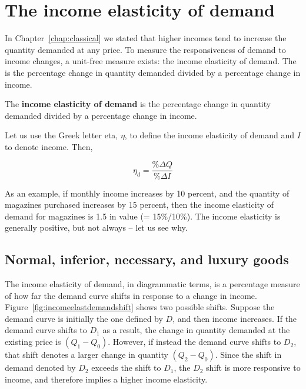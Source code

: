 \section{The income elasticity of demand}\label{sec:ch4sec5}

In Chapter~\ref{chap:classical} we stated that higher incomes tend to increase the quantity demanded at any price. To measure the responsiveness of demand to income changes, a unit-free measure exists: the income elasticity of demand. The  is the percentage change in quantity demanded divided by a percentage change in income.

\begin{DefBox}
The \textbf{income elasticity of demand} is the percentage change in quantity demanded divided by a percentage change in income.
\end{DefBox}

Let us use the Greek letter eta, $\eta$, to define the income elasticity of demand and $I$ to denote income. Then,

\begin{equation*}
\eta_d=\frac{\%\Delta Q}{\%\Delta I}
\end{equation*}

As an example, if monthly income increases by 10 percent, and the quantity of magazines purchased increases by 15 percent, then the income elasticity of demand for magazines is 1.5 in value (= 15\%/10\%). The income elasticity is generally positive, but not always -- let us see why.

\subsection*{Normal, inferior, necessary, and luxury goods}

The income elasticity of demand, in diagrammatic terms, is a percentage measure of how far the demand curve shifts in response to a change in income. Figure~\ref{fig:incomeelastdemandshift} shows two possible shifts. Suppose the demand curve is initially the one defined by $D$, and then income increases. If the demand curve shifts to $D_1$ as a result, the change in quantity demanded at the existing price is $(Q_1-Q_0)$. However, if instead the demand curve shifts to $D_2$, that shift denotes a larger change in quantity $(Q_2-Q_0)$. Since the shift in demand denoted by $D_2$ exceeds the shift to $D_1$, the $D_2$ shift is more responsive to income,
and therefore implies a higher income elasticity.

